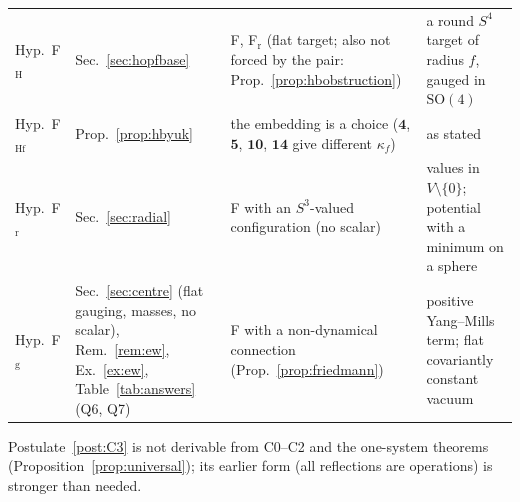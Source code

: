 \documentclass[aps,pra,onecolumn,superscriptaddress,nofootinbib,10pt]{revtex4-2}
\theoremstyle{definition}
\theoremstyle{remark}
\newcommand{\SO}{\mathrm{SO}}
\begin{document}
\begin{table}[h]
\begin{tabular}{@{}p{}p{}p{}p{}@{}}
Hyp.\ F$_{\mathrm H}$ & Sec.~\ref{sec:hopfbase} & F, F$_{\mathrm r}$ (flat target; also not forced by the pair: Prop.~\ref{prop:hbobstruction}) & a round $S^4$ target of radius $f$, gauged in $\SO(4)$\\
Hyp.\ F$_{\mathrm{Hf}}$ & Prop.~\ref{prop:hbyuk} & the embedding is a choice ($\mathbf4$, $\mathbf5$, $\mathbf{10}$, $\mathbf{14}$ give different $\kappa_f$) & as stated\\
Hyp.\ F$_{\mathrm r}$ & Sec.~\ref{sec:radial} & F with an $S^3$-valued configuration (no scalar) & values in $V\setminus\{0\}$; potential with a minimum on a sphere\\
Hyp.\ F$_{\mathrm g}$ & Sec.~\ref{sec:centre} (flat gauging, masses, no scalar), Rem.~\ref{rem:ew}, Ex.~\ref{ex:ew}, Table~\ref{tab:answers} (Q6, Q7) & F with a non-dynamical connection (Prop.~\ref{prop:friedmann}) & positive Yang--Mills term; flat covariantly constant vacuum\\
\bottomrule
\end{tabular}
\end{table}

Postulate~\ref{post:C3} is not derivable from C0--C2 and the
one-system theorems (Proposition~\ref{prop:universal}); its earlier form (all reflections are
operations) is stronger than needed.
\end{document}
